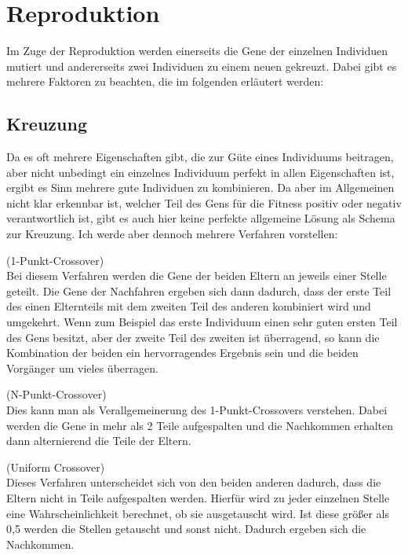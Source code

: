 \section{Reproduktion}
Im Zuge der Reproduktion werden einerseits die Gene der einzelnen Individuen mutiert und andererseits zwei Individuen zu einem neuen gekreuzt. Dabei gibt es mehrere Faktoren zu beachten, die im folgenden erläutert werden:
\subsection{Kreuzung}
Da es oft mehrere Eigenschaften gibt, die zur Güte eines Individuums beitragen, aber nicht unbedingt ein einzelnes Individuum perfekt in allen Eigenschaften ist, ergibt es Sinn mehrere gute Individuen zu kombinieren. Da aber im Allgemeinen nicht klar erkennbar ist, welcher Teil des Gens für die Fitness positiv oder negativ verantwortlich ist, gibt es auch hier keine perfekte allgemeine Lösung als Schema zur Kreuzung. Ich werde aber dennoch mehrere Verfahren vorstellen:\\
\setcounter{algo}{0}
\begin{algo}(1-Punkt-Crossover)\\
	Bei diesem Verfahren werden die Gene der beiden Eltern an jeweils einer Stelle geteilt. Die Gene der Nachfahren ergeben sich dann dadurch, dass der erste Teil des einen Elternteils mit dem zweiten Teil des anderen kombiniert wird und umgekehrt. Wenn zum Beispiel das erste Individuum einen sehr guten ersten Teil des Gens besitzt, aber der zweite Teil des zweiten ist überragend, so kann die Kombination der beiden ein hervorragendes Ergebnis sein und die beiden Vorgänger um vieles überragen.
\end{algo}

\begin{algo}(N-Punkt-Crossover)\\
	Dies kann man als Verallgemeinerung des 1-Punkt-Crossovers verstehen. Dabei werden die Gene in mehr als 2 Teile aufgespalten und die Nachkommen erhalten dann alternierend die Teile der Eltern.
\end{algo}

\begin{algo}(Uniform Crossover)\\
	Dieses Verfahren unterscheidet sich von den beiden anderen dadurch, dass die Eltern nicht in Teile aufgespalten werden. Hierfür wird zu jeder einzelnen Stelle eine Wahrscheinlichkeit berechnet, ob sie ausgetauscht wird. Ist diese größer als 0,5 werden die Stellen getauscht und sonst nicht. Dadurch ergeben sich die Nachkommen.
\end{algo}

